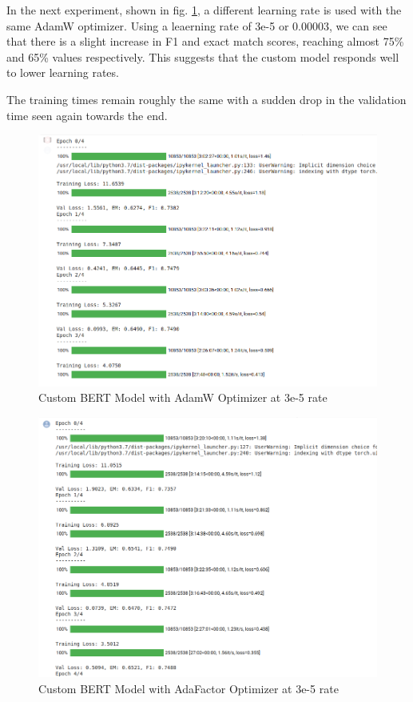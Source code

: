 \documentclass[a4paper,12pt]{report}
\begin{document}
	In the next experiment, shown in fig. \ref{adam3e}, a different learning rate is used with the same AdamW optimizer. Using a leaerning rate of 3e-5 or 0.00003, we can see that there is a slight increase in F1 and exact match scores, reaching almost 75\% and 65\% values respectively. This suggests that the custom model responds well to lower learning rates.

	The training times remain roughly the same with a sudden drop in the validation time seen again towards the end.

		\begin{figure}[!h]
			\centering
			\includegraphics[scale=0.35]{../images/AdamW3e.png}
			\caption{Custom BERT Model with AdamW Optimizer at 3e-5 rate}\label{adam3e}
		\end{figure}

		\begin{figure}[!h]
			\centering
			\includegraphics[scale=0.35]{../images/AdaFactor3e.png}
			\caption{Custom BERT Model with AdaFactor Optimizer at 3e-5 rate}\label{ada3e}
		\end{figure}
\end{document}
